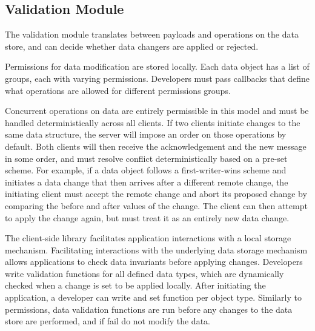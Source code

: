 \subsection{Validation Module}
The validation module translates between payloads and operations on the data store, and can decide whether data changers are applied or rejected.

Permissions for data modification are stored locally. Each data object has a list of groups, each with varying permissions. Developers must pass callbacks that define what operations are allowed for different permissions groups. 


Concurrent operations on data are entirely permissible in this model and must be handled deterministically across all clients. If two clients initiate changes to the same data structure, the server will impose an order on those operations by default. Both clients will then receive the acknowledgement and the new message in some order, and must resolve conflict deterministically based on a pre-set scheme. For example, if a data object follows a first-writer-wins scheme and initiates a data change that then arrives after a different remote change, the initiating client must accept the remote change and abort its proposed change by comparing the before and after values of the change. The client can then attempt to apply the change again, but must treat it as an entirely new data change.

The \name{} client-side library facilitates application interactions with a local storage mechanism. Facilitating interactions with the underlying data storage mechanism allows \name{} applications to check data invariants before applying changes. Developers write validation functions for all defined data types, which are dynamically checked when a change is set to be applied locally. After initiating the application, a developer can write and set function per object type. Similarly to permissions, data validation functions are run before any changes to the data store are performed, and if fail do not modify the data.
